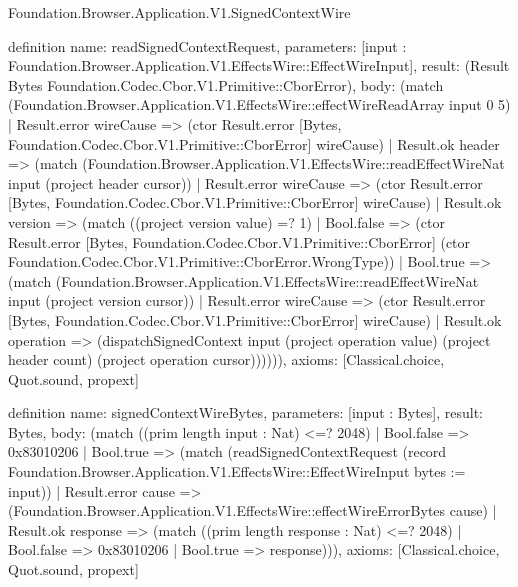 \begin{lexlean}{Foundation.Browser.Application.V1.SignedContextWire}
\begin{semanticmodule}
definition{
  name: readSignedContextRequest,
  parameters: [input : Foundation.Browser.Application.V1.EffectsWire::EffectWireInput],
  result: (Result Bytes Foundation.Codec.Cbor.V1.Primitive::CborError),
  body: (match (Foundation.Browser.Application.V1.EffectsWire::effectWireReadArray input 0 5)
    | Result.error wireCause => (ctor Result.error [Bytes, Foundation.Codec.Cbor.V1.Primitive::CborError] wireCause)
    | Result.ok header => (match (Foundation.Browser.Application.V1.EffectsWire::readEffectWireNat input (project header cursor))
      | Result.error wireCause => (ctor Result.error [Bytes, Foundation.Codec.Cbor.V1.Primitive::CborError] wireCause)
      | Result.ok version => (match ((project version value) =? 1)
        | Bool.false => (ctor Result.error [Bytes, Foundation.Codec.Cbor.V1.Primitive::CborError] (ctor Foundation.Codec.Cbor.V1.Primitive::CborError.WrongType))
        | Bool.true => (match (Foundation.Browser.Application.V1.EffectsWire::readEffectWireNat input (project version cursor))
          | Result.error wireCause => (ctor Result.error [Bytes, Foundation.Codec.Cbor.V1.Primitive::CborError] wireCause)
          | Result.ok operation => (dispatchSignedContext input (project operation value) (project header count) (project operation cursor)))))),
  axioms: [Classical.choice, Quot.sound, propext]
}

definition{
  name: signedContextWireBytes,
  parameters: [input : Bytes],
  result: Bytes,
  body: (match ((prim length input : Nat) <=? 2048)
    | Bool.false => 0x83010206
    | Bool.true => (match (readSignedContextRequest (record Foundation.Browser.Application.V1.EffectsWire::EffectWireInput {bytes := input}))
      | Result.error cause => (Foundation.Browser.Application.V1.EffectsWire::effectWireErrorBytes cause)
      | Result.ok response => (match ((prim length response : Nat) <=? 2048)
        | Bool.false => 0x83010206
        | Bool.true => response))),
  axioms: [Classical.choice, Quot.sound, propext]
}
\end{semanticmodule}
\end{lexlean}

